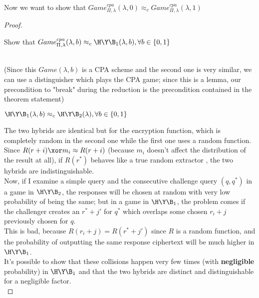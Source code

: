 Now we want to show that $Game_{\Pi, \lambda}^{cpa}(\lambda,0)
\approx_{c}Game_{\Pi, \lambda}^{cpa}(\lambda,1) $
\begin{proof}

    \begin{exercise}
        \begin{lemma}
        Show that $Game_{\Pi, \lambda}^{cpa}(\lambda,b) \approx_{c} \H\Y\B_{1}
        (\lambda, b), \forall b \in \{0,1\} $
        \end{lemma}\\
        
        (Since this $Game(\lambda, b)$ is a CPA scheme and the second one is
        very similar, we can use a distinguisher which plays the CPA game; since
        this is a lemma, our precondition to "break" during the reduction is
        the precondition contained in the theorem statement)
    \end{exercise}

    \begin{lemma}
        $\H\Y\B_{1}(\lambda,b) \approx_{c} \H\Y\B_{2} (\lambda), \forall b \in
        \{0,1\}$
    \end{lemma}

    The two hybrids are identical but for the encryption function, which is
    completely random in the second one while the first one uses a random
    function.\\
    
    Since  $R(r + i ) \xor m_{i} \approx R(r + i ) $ (because
    $m_{i}$ doesn't affect the distribution of the result at all), if  $R(r^{*})$ 
     behaves like a true random extractor , the two hybrids are
    indistinguishable.\\

    Now, if I examine a simple query and the consecutive challenge query $(q,
    q^{*})$ in a game in $\H\Y\B_{2}$, the responses will be chosen at random
    with very low probability of being the same; but in a game in
    $\H\Y\B_{1}$, the problem comes if the challenger 
    creates an $r^{*}+ j'$ for $q^{*}$ which overlaps some chosen
    $r_{i} + j$ previously chosen for $q$.\\
    This is bad, because $R(r_{i} + j)=R(r^{*} + j')$ since $R$ is a random
    function, and the probability of outputting the same response ciphertext
    will be much higher in $\H\Y\B_{1}$.\\

    It's possible to show that these collisions happen very few times
    (with \textbf{negligible} probability) in $\H\Y\B_{1}$ and  that the two 
    hybrids are distinct and
    distinguishable for a negligible factor.\\


\end{proof}
